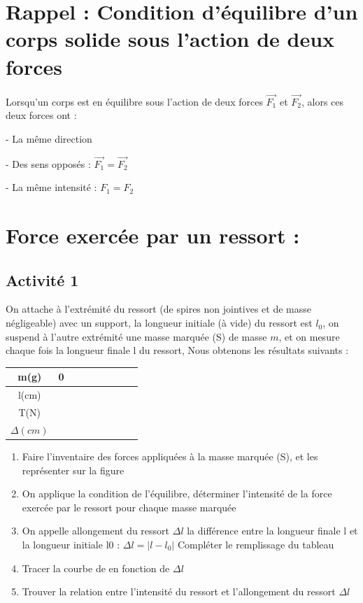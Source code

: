 \documentclass[12pt]{article}
\begin{document}
\section{ Rappel : Condition d’équilibre d'un corps solide sous l'action de deux forces}

Lorsqu’un corps est en équilibre sous l’action de deux forces $\vec{F_1}$ et $\vec{F_2}$, alors ces deux forces ont :

 - La même direction
 
 - Des sens opposés : $\vec{F_1} = \vec{F_2}$
 
 - La même intensité : $F_1 = F_2$

\section{Force exercée par un ressort : }
\subsection{Activité 1 }


On attache à l’extrémité du ressort (de spires non jointives et de masse négligeable)
avec un support, la longueur initiale (à vide) du ressort est $l_0$, on suspend à l’autre
extrémité une masse marquée (S) de masse $m$, et on mesure chaque fois la longueur
finale l du ressort, Nous obtenons les résultats suivants :

\begin{center}
\begin{tabular}{ |c|c|c|c|c|c|c|c|c| }
 \hline
    m(g)         & 0  &  & & & & & & \\\hline
    l(cm)        &    &  & & & & & &  \\\hline
    T(N)         &    &  & & & & & &   \\\hline
    $\Delta(cm)$ &    &  & & & & & &    \\\hline
 \hline
\end{tabular}
\end{center}
\begin{enumerate}
        \item Faire l’inventaire des forces appliquées à la masse marquée (S), et les représenter sur la figure
        \item On applique la condition de l’équilibre, déterminer l’intensité de la force exercée par le ressort pour
chaque masse marquée
        \item On appelle allongement du ressort $\Delta{l}$ la différence entre la longueur finale l et la longueur initiale l0 :
            $\Delta{l} = |l - l_0|$  Compléter le remplissage du tableau
        \item Tracer la courbe de en fonction de $\Delta{l}$
        \item Trouver la relation entre l’intensité du ressort et l’allongement du ressort $\Delta{l}$
\end{enumerate}
\end{document}
